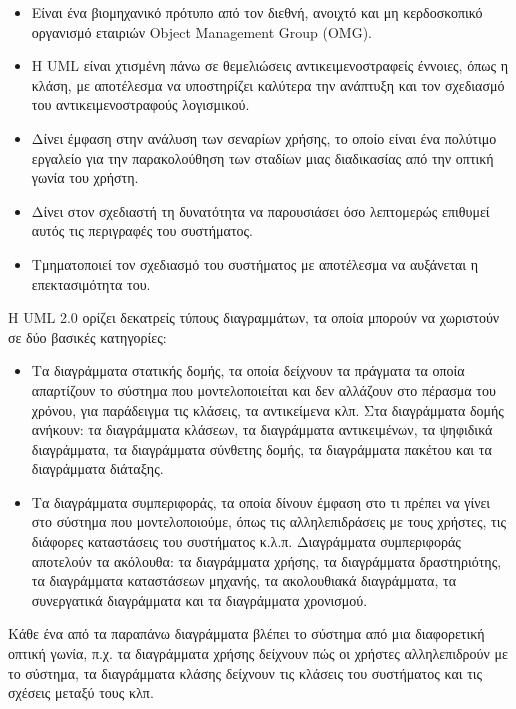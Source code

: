 	 \begin{itemize}
	 \item Είναι ένα βιομηχανικό πρότυπο από τον διεθνή, ανοιχτό και μη κερδοσκοπικό οργανισμό εταιριών Object Management Group (OMG).
	 \item Η UML είναι χτισμένη πάνω σε θεμελιώσεις αντικειμενοστραφείς έννοιες, όπως η κλάση, με αποτέλεσμα να υποστηρίζει καλύτερα την ανάπτυξη και τον σχεδιασμό του αντικειμενοστραφούς λογισμικού.
	 \item Δίνει έμφαση στην ανάλυση των σεναρίων χρήσης, το οποίο είναι ένα πολύτιμο εργαλείο για την παρακολούθηση των σταδίων μιας διαδικασίας από την οπτική γωνία του χρήστη.
	 \item Δίνει στον σχεδιαστή τη δυνατότητα να παρουσιάσει όσο λεπτομερώς επιθυμεί αυτός τις περιγραφές του συστήματος.
	 \item Τμηματοποιεί τον σχεδιασμό του συστήματος με αποτέλεσμα να αυξάνεται η επεκτασιμότητα του.
\end{itemize}	 

	Η UML 2.0 ορίζει δεκατρείς τύπους διαγραμμάτων, τα οποία μπορούν να χωριστούν σε δύο βασικές κατηγορίες:
	
	\begin{itemize}
		\item Τα διαγράμματα στατικής δομής, τα οποία δείχνουν τα πράγματα τα οποία απαρτίζουν το σύστημα που μοντελοποιείται και δεν αλλάζουν στο πέρασμα του χρόνου, για παράδειγμα τις κλάσεις, τα αντικείμενα κλπ. Στα διαγράμματα δομής ανήκουν: τα διαγράμματα κλάσεων, τα διαγράμματα αντικειμένων, τα ψηφιδικά διαγράμματα, τα διαγράμματα σύνθετης δομής, τα διαγράμματα πακέτου και τα διαγράμματα διάταξης.
		
		\item Τα διαγράμματα συμπεριφοράς, τα οποία δίνουν έμφαση στο τι πρέπει να γίνει στο σύστημα που μοντελοποιούμε, όπως τις αλληλεπιδράσεις με τους χρήστες, τις διάφορες καταστάσεις του συστήματος κ.λ.π. Διαγράμματα συμπεριφοράς αποτελούν τα ακόλουθα: τα διαγράμματα χρήσης, τα διαγράμματα δραστηριότης, τα διαγράμματα καταστάσεων μηχανής, τα ακολουθιακά διαγράμματα, τα συνεργατικά διαγράμματα και τα διαγράμματα χρονισμού.
	\end{itemize}
	
Κάθε ένα από τα παραπάνω διαγράμματα βλέπει το σύστημα από μια διαφορετική οπτική γωνία, π.χ. τα διαγράμματα χρήσης δείχνουν πώς οι χρήστες αλληλεπιδρούν με το σύστημα, τα διαγράμματα κλάσης δείχνουν τις κλάσεις του συστήματος και τις σχέσεις μεταξύ τους κλπ.
	
